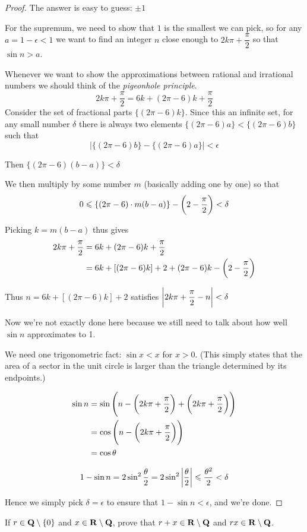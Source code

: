 \begin{proof}
The answer is easy to guess: $\pm1$

For the supremum, we need to show that $1$ is the smallest we can pick, so for any $a=1-\epsilon<1$ we want to find an integer $n$ close enough to $2k\pi+\dfrac{\pi}{2}$ so that $\sin n > a$.

Whenever we want to show the approximations between rational and irrational numbers we should think of the \emph{pigeonhole principle}.
\[ 2k\pi+\frac{\pi}{2}=6k+(2\pi-6)k+\frac{\pi}{2} \]
Consider the set of fractional parts $\{(2\pi-6)k\}$. Since this an infinite set, for any small number $\delta$ there is always two elements $\{(2\pi-6)a\}<\{(2\pi-6)b\}$ such that
\[ |\{(2\pi-6)b\}-\{(2\pi-6)a\}|<\epsilon \]

Then $\{(2\pi-6)(b-a)\}<\delta$

We then multiply by some number $m$ (basically adding one by one) so that
\[ 0 \leqslant \{(2\pi-6)\cdot m(b-a)\}-\left(2-\frac{\pi}{2}\right)<\delta \]

Picking $k=m(b-a)$ thus gives
\begin{align*}
2k\pi+\frac{\pi}{2} &= 6k+(2\pi-6)k+\frac{\pi}{2} \\
&= 6k+[(2\pi-6)k]+2+{(2\pi-6)k}-\left(2-\frac{\pi}{2}\right)
\end{align*}

Thus $n=6k+[(2\pi-6)k]+2$ satisfies $\left|2k\pi+\dfrac{\pi}{2}-n\right|<\delta$

Now we're not exactly done here because we still need to talk about how well $\sin n$ approximates to 1.

We need one trigonometric fact: $\sin x<x$ for $x>0$. (This simply states that the area of a sector in the unit circle is larger than the triangle determined by its endpoints.)

\begin{align*}
\sin n&=\sin\left(n-\left(2k\pi+\frac{\pi}{2}\right)+\left(2k\pi+\frac{\pi}{2}\right)\right) \\
&=\cos\left(n-\left(2k\pi+\frac{\pi}{2}\right)\right) \\
&=\cos\theta
\end{align*}

\[1-\sin n = 2 \sin^2 \frac{\theta}{2} = 2 \sin^2 \left|\frac{\theta}{2}\right| \leqslant \frac{\theta^2}{2}<\delta \]

Hence we simply pick $\delta=\epsilon$ to ensure that $1 - \sin n<\epsilon$, and we're done.
\end{proof}

\begin{prbm}
If $r\in\mathbf Q\setminus\{0\}$ and $x\in\mathbf R\setminus\mathbf Q$, prove that $r+x\in\mathbf R\setminus\mathbf Q$ and $rx\in\mathbf R\setminus\mathbf Q$.
\end{prbm}

